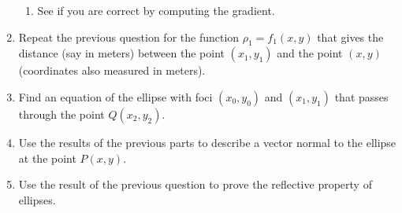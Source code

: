 \documentclass{ximera}
\begin{document}
\begin{question}
\begin{enumerate}
\begin{enumerate}
\item See if you are correct by computing the gradient.
\end{enumerate}

\item Repeat the previous question for the function $\rho_1 = f_1(x,y)$ that gives the distance (say in meters) between the point $(x_1, y_1)$ and the point $(x,y)$ (coordinates also measured in meters).

\item Find an equation of the ellipse with foci $(x_0,y_0)$ and $(x_1, y_1)$ that passes through the point $Q(x_2,y_2)$.

\item Use the results of the previous parts to describe a vector normal to the ellipse at the point $P(x,y)$.

\item Use the result of the previous question to prove the reflective property of ellipses.


\end{enumerate}



\end{question}
\end{document}
